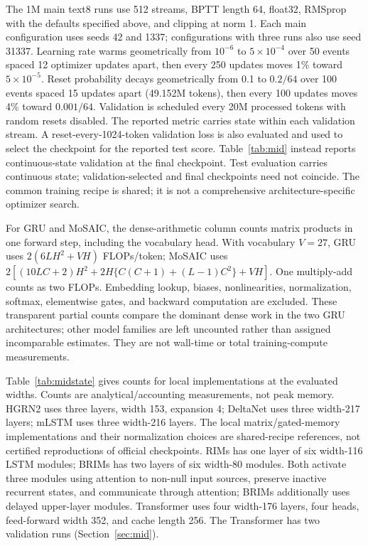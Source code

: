 \documentclass[letterpaper,twoside]{article}
\begin{document}
The 1M main text8 runs use 512 streams, BPTT length 64, float32, RMSprop with the defaults specified above, and clipping at norm 1. Each main configuration uses seeds 42 and 1337; configurations with three runs also use seed 31337. Learning rate warms geometrically from $10^{-6}$ to $5\times10^{-4}$ over 50 events spaced 12 optimizer updates apart, then every 250 updates moves 1\% toward $5\times10^{-5}$. Reset probability decays geometrically from 0.1 to $0.2/64$ over 100 events spaced 15 updates apart (49.152M tokens), then every 100 updates moves 4\% toward $0.001/64$. Validation is scheduled every 20M processed tokens with random resets disabled. The reported metric carries state within each validation stream. A reset-every-1024-token validation loss is also evaluated and used to select the checkpoint for the reported test score. Table~\ref{tab:mid} instead reports continuous-state validation at the final checkpoint. Test evaluation carries continuous state; validation-selected and final checkpoints need not coincide. The common training recipe is shared; it is not a comprehensive architecture-specific optimizer search.



For GRU and MoSAIC, the dense-arithmetic column counts matrix products in one forward step, including the vocabulary head. With vocabulary $V=27$, GRU uses $2(6LH^2+VH)$ FLOPs/token; MoSAIC uses $2[(10LC+2)H^2+2H\{C(C+1)+(L-1)C^2\}+VH]$. One multiply-add counts as two FLOPs. Embedding lookup, biases, nonlinearities, normalization, softmax, elementwise gates, and backward computation are excluded. These transparent partial counts compare the dominant dense work in the two GRU architectures; other model families are left uncounted rather than assigned incomparable estimates. They are not wall-time or total training-compute measurements.

Table~\ref{tab:midstate} gives counts for local implementations at the evaluated widths. Counts are analytical/accounting measurements, not peak memory. HGRN2 uses three layers, width 153, expansion 4; DeltaNet uses three width-217 layers; mLSTM uses three width-216 layers. The local matrix/gated-memory implementations and their normalization choices are shared-recipe references, not certified reproductions of official checkpoints. RIMs has one layer of six width-116 LSTM modules; BRIMs has two layers of six width-80 modules. Both activate three modules using attention to non-null input sources, preserve inactive recurrent states, and communicate through attention; BRIMs additionally uses delayed upper-layer modules. Transformer uses four width-176 layers, four heads, feed-forward width 352, and cache length 256. The Transformer has two validation runs (Section~\ref{sec:mid}).
\end{document}
